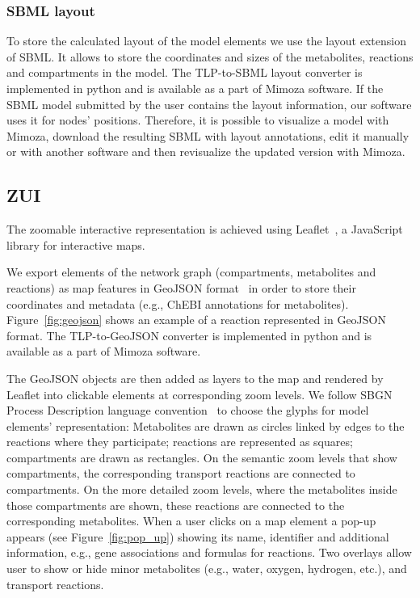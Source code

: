 \documentclass{bmcart}
\begin{document}
\subsubsection*{SBML layout}
To store the calculated layout of the model elements we use the layout extension~\cite{Gauges2013} of SBML. It allows to store the coordinates and sizes of the metabolites, reactions and compartments in the model. The TLP-to-SBML layout converter is implemented in python and is available as a part of Mimoza software.
If the SBML model submitted by the user contains the layout information, our software uses it for nodes' positions. Therefore, it is possible to visualize a model with Mimoza, download the resulting SBML with layout annotations, edit it manually or with another software and then revisualize the updated version with Mimoza.
 
\subsection*{ZUI}

The zoomable interactive representation is achieved using Leaflet~\cite{Agafonkin}, a JavaScript library for interactive maps. 

We export elements of the network graph (compartments, metabolites and reactions) as map features in GeoJSON format~\cite{Butler} in order to store their coordinates and metadata (e.g., ChEBI annotations for metabolites). Figure~\ref{fig:geojson} shows an example of a reaction represented in GeoJSON format. The TLP-to-GeoJSON converter is implemented in python and is available as a part of Mimoza software. 

The GeoJSON objects are then added as layers to the map and rendered by Leaflet into clickable elements at corresponding zoom levels. We follow SBGN Process Description language convention~\cite{LeNovere2009} to choose the glyphs for model elements' representation: Metabolites are drawn as circles linked by edges to the reactions where they participate; reactions are represented as squares; compartments are drawn as rectangles. On the semantic zoom levels that show compartments, the corresponding transport reactions are connected to compartments. On the more detailed zoom levels, where the metabolites inside those compartments are shown, these reactions are connected to the corresponding metabolites. When a user clicks on a map element a pop-up appears (see Figure~\ref{fig:pop_up}) showing its name, identifier and additional information, e.g., gene associations and formulas for reactions. Two overlays allow user to show or hide minor metabolites (e.g., water, oxygen, hydrogen, etc.), and  transport reactions.
 
\end{document}
